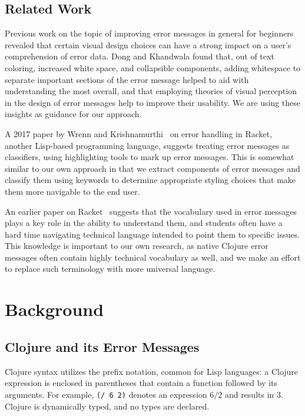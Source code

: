 \documentclass[12pt]{article}
\newcommand{\comment}[1]{{\bf \tt  {#1}}}
\newcommand{\emcomment}[1]{\textcolor{ForestGreen}{\comment{Elena: {#1}}}}
\begin{document}
\subsection{Related Work}\label{subsec:related}

Previous work on the topic of improving error messages in general for beginners~\cite{cosmetic} revealed that 
certain visual design choices can have a strong impact on a user's comprehension of error data. Dong and Khandwala found that, 
out of text coloring, increased white space, and collapsible components, adding whitespace to separate important sections of the 
error message helped to aid with understanding the most overall, and that employing theories of visual perception in the design 
of error messages help to improve their usability. 
We are using these insights as guidance for our approach.

A 2017 paper by Wrenn and Krishnamurthi~\cite{classifiers} on error handling in Racket, another Lisp-based programming language, 
suggests treating error messages as classifiers, using highlighting tools to mark up error messages. This is somewhat similar to 
our own approach in that we extract components of error messages and classify them using keywords to determine appropriate styling 
choices that make them more navigable to the end user.

An earlier paper on Racket~\cite{language} suggests that the vocabulary used in error messages plays a key role in the ability to
understand them, and students often have a hard time navigating technical language intended to point them to specific issues. This
knowledge is important to our own research, as native Clojure error messages often contain highly technical vocabulary as well, and 
we make an effort to replace such terminology with more universal language.

\section{Background}\label{sec:background}

\subsection{Clojure and its Error Messages}\label{subsec:clojure-errs}
Clojure syntax utilizes the prefix notation, common for Lisp languages: a Clojure expression is enclosed in parentheses that contain a function followed by its arguments. 
For example, \texttt{(/ 6 2)} denotes an expression $6 / 2$ and results in $3$. Clojure is dynamically typed, and no types are declared. 
\end{document}

